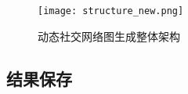 
\begin{figure}
  \centering
  \texttt{[image: structure\_new.png]}
  \caption{动态社交网络图生成整体架构}
  \label{fig:structure}
\end{figure}

\subsection{结果保存}

